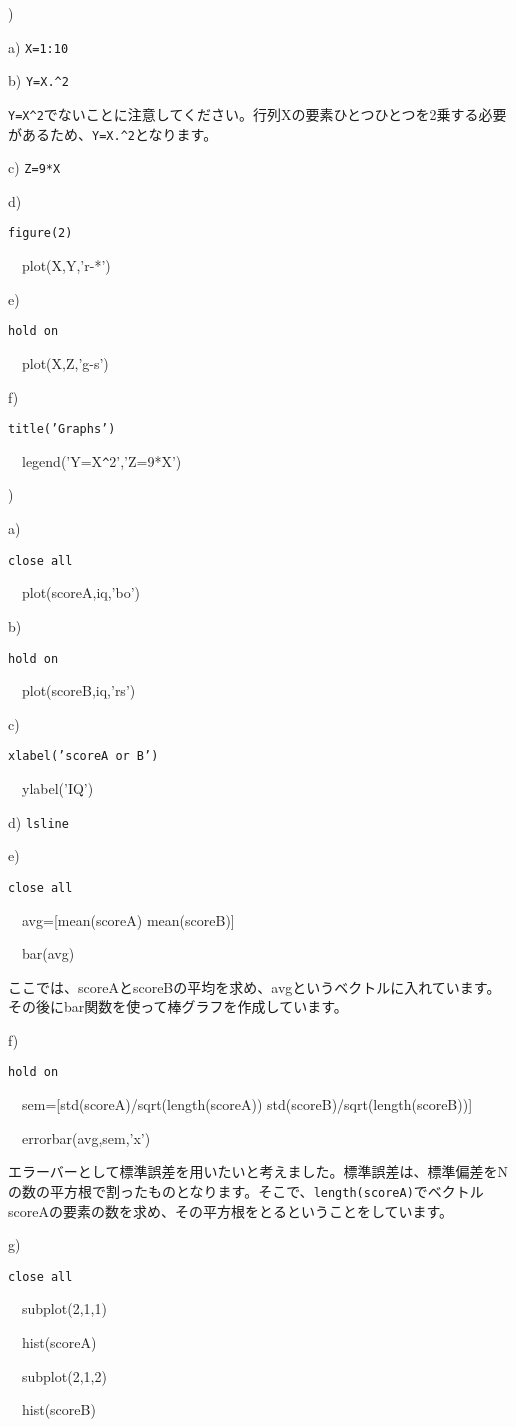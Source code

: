 \documentclass{jsarticle}
\begin{document}
\bigskip

)

a) {\tt X=1:10}

b) {\tt Y=X.\verb|^|2}

\begin{screen}
{ \tt Y=X\verb|^|2}でないことに注意してください。行列Xの要素ひとつひとつを2乗する必要があるため、{\tt Y=X.\verb|^|2}となります。
\end{screen}

c) {\tt Z=9*X}

d) {\tt figure(2)

\ \ plot(X,Y,'r-*')}

e) {\tt hold on

\ \ plot(X,Z,'g-s')}

f) {\tt title('Graphs')

\ \ legend('Y=X\verb|^|2','Z=9*X')
}

\bigskip

)

a) {\tt close all

\ \ plot(scoreA,iq,'bo')}

b) {\tt hold on

\ \ plot(scoreB,iq,'rs')}

c) {\tt xlabel('scoreA or B')

\ \ ylabel('IQ')}

d) {\tt lsline}

e) {\tt close all

\ \ avg=[mean(scoreA) mean(scoreB)]

\ \ bar(avg)}

\begin{screen}
ここでは、scoreAとscoreBの平均を求め、avgというベクトルに入れています。
その後にbar関数を使って棒グラフを作成しています。
\end{screen}

f) {\tt hold on

\ \ sem=[std(scoreA)/sqrt(length(scoreA)) std(scoreB)/sqrt(length(scoreB))]

\ \ errorbar(avg,sem,'x')}

\begin{screen}
エラーバーとして標準誤差を用いたいと考えました。標準誤差は、標準偏差をNの数の平方根で割ったものとなります。そこで、{\tt length(scoreA)}でベクトルscoreAの要素の数を求め、その平方根をとるということをしています。
\end{screen}

g) {\tt close all

\ \ subplot(2,1,1)

\ \ hist(scoreA)

\ \ subplot(2,1,2)

\ \ hist(scoreB)
}
\end{document}
